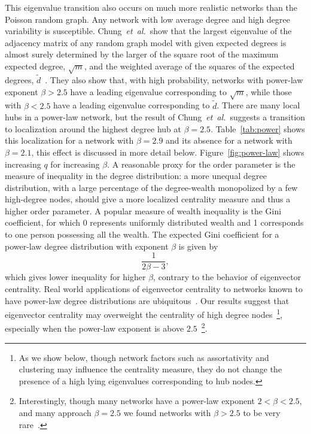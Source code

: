 \documentclass[twocolumn,prl,superscriptaddress]{revtex4}
\newcommand{\etal}{{\it{}et~al.}}
\begin{document}
This eigenvalue transition also occurs on much more realistic networks than the Poisson random graph. Any network with low average degree and high degree variability is susceptible. Chung~\etal\ show that the largest eigenvalue of the adjacency matrix of any random graph model with given expected degrees is almost surely determined by the larger of the square root of the maximum expected degree, $\sqrt{m}$, and the weighted average of the squares of the expected degrees, $\tilde{d}$~\cite{chung03}. They also show that, with high probability, networks with power-law exponent $\beta > 2.5$ have a leading eigenvalue corresponding to $\sqrt{m}$, while those with $\beta < 2.5$ have a leading eigenvalue corresponding to $\tilde{d}$. There are many local hubs in a power-law network, but the result of Chung~\etal\ suggests a transition to localization around the highest degree hub at $\beta = 2.5$. Table~\ref{tab:power} shows this localization for a network with $\beta=2.9$ and its absence for a network with $\beta=2.1$, this effect is discussed in more detail below. Figure~\ref{fig:power-law} shows increasing $q$ for increasing $\beta$. 
A reasonable proxy for the order parameter is the measure of inequality in the degree distribution: a more unequal degree distribution, with a large percentage of the degree-wealth monopolized by a few high-degree nodes, should give a more localized centrality measure and thus a higher order parameter.
A popular measure of wealth inequality is the Gini coefficient, for which 0 represents uniformly distributed wealth and 1 corresponds to one person possessing all the wealth.
The expected Gini coefficient for a power-law degree distribution with exponent $\beta$ is given by
\begin{equation*}
\frac{1}{2\beta - 3},
\end{equation*}
which gives lower inequality for higher $\beta$, contrary to the behavior of eigenvector centrality.
Real world applications of eigenvector centrality to networks known to have power-law degree distributions are ubiquitous~\cite{canright06,page99}. Our results suggest that eigenvector centrality may overweight the centrality of high degree nodes~\footnote{As we show below, though network factors such as assortativity and clustering may influence the centrality measure, they do not change the presence of a high lying eigenvalues corresponding to hub nodes.}, especially when the power-law exponent is above $2.5$~\footnote{Interestingly, though many networks have a power-law exponent $2 < \beta < 2.5$, and many approach $\beta = 2.5$ we found networks with $\beta > 2.5$ to be very rare~\cite{newman03}.}.
\end{document}
